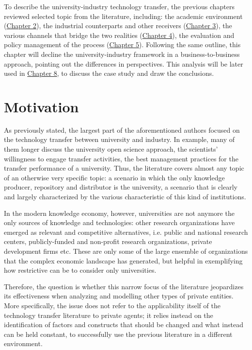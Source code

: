 

To describe the university-industry technology transfer, the previous chapters reviewed selected topic from the literature, including: the academic environment (\hyperref[Chapter2]{Chapter 2}), the industrial counterparts and other receivers (\hyperref[Chapter3]{Chapter 3}), the various channels that bridge the two realities (\hyperref[Chapter4]{Chapter 4}), the evaluation and policy management of the process (\hyperref[Chapter5]{Chapter 5}). Following the same outline, this chapter will decline the university-industry framework in a business-to-business approach, pointing out the differences in perspectives. This analysis will be later used in \hyperref[Chapter8]{Chapter 8}, to discuss the case study and draw the conclusions. 

\label{Chapter6}

\section{Motivation}

As previously stated, the largest part of the aforementioned authors focused on the technology transfer between university and industry. In example, many of them longer discuss the university open science approach, the scientists' willingness to engage transfer activities, the best management practices for the transfer performance of a university. Thus, the literature covers almost any topic of an otherwise very specific topic: a scenario in which the only knowledge producer, repository and distributor is the university, a scenario that is clearly and largely characterized by the various characteristic of this kind of institutions.

In the modern knowledge economy, however, universities are not anymore the only sources of knowledge and technologies: other research organizations have emerged as relevant and competitive alternatives, i.e. public and national research centers, publicly-funded and non-profit research organizations, private development firms etc. These are only some of the large ensemble of organizations that the complex economic landscape has generated, but helpful in exemplifying how restrictive can be to consider only universities.

Therefore, the question is whether this narrow focus of the literature jeopardizes its effectiveness when analyzing and modelling other types of private entities. More specifically, the issue does not refer to the applicability itself of the technology transfer literature to private agents; it relies instead on the identification of factors and constructs that should be changed and what instead can be held constant, to successfully use the previous literature in a different environment.

